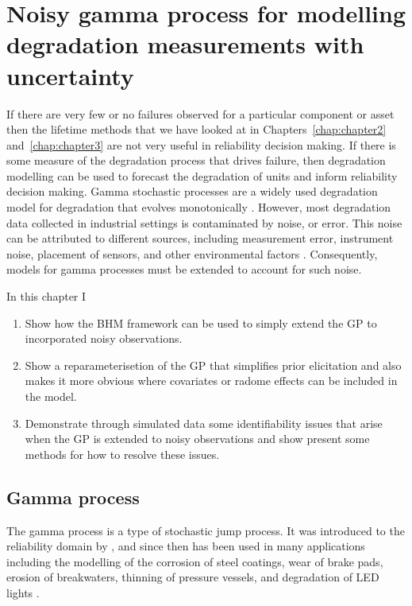 \chapter{Noisy gamma process for modelling degradation measurements with uncertainty}\label{chap:chapter4}

If there are very few or no failures observed for a particular component or asset then the lifetime methods that we have looked at in Chapters~\ref{chap:chapter2} and~\ref{chap:chapter3} are not very useful in reliability decision making. If there is some measure of the degradation process that drives failure, then degradation modelling can be used to forecast the degradation of units and inform reliability decision making. Gamma stochastic processes are a widely used degradation model for degradation that evolves monotonically \citep{lawless_covariates_2004}. However, most degradation data collected in industrial settings is contaminated by noise, or error. This noise can be attributed to different sources, including measurement error, instrument noise, placement of sensors, and other environmental factors \citep{ye:2015}. Consequently, models for gamma processes must be extended to account for such noise.

In this chapter I

\begin{enumerate}
  \item Show how the BHM framework can be used to simply extend the GP to incorporated noisy observations.
  \item Show a reparameterisetion of the GP that simplifies prior elicitation and also makes it more obvious where covariates or radome effects can be included in the model.
  \item Demonstrate through simulated data some identifiability issues that arise when the GP is extended to noisy observations and show present some methods for how to resolve these issues. 
\end{enumerate}

\section{Gamma process} \label{sec:GP}

The gamma process is a type of stochastic jump process. It was introduced to the reliability domain by \citet{abdel-hameed_gamma_1975}, and since then has been used in many applications including the modelling of the corrosion of steel coatings, wear of brake pads, erosion of breakwaters, thinning of pressure vessels, and degradation of LED lights \citep{van_noortwijk_survey_2009}. 

